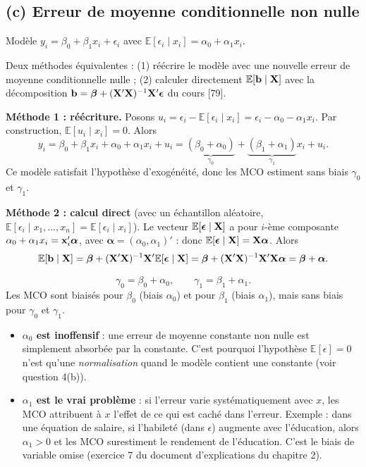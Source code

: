 \documentclass[11pt,a4paper]{article}
\newcommand{\vbeta}{\bm{\beta}}\newcommand{\veps}{\bm{\epsilon}}\newcommand{\valpha}{\bm{\alpha}}
\newcommand{\E}{\mathbb{E}}\newcommand{\Var}{\operatorname{Var}}\newcommand{\Cov}{\operatorname{Cov}}
\begin{document}
\subsection{(c) Erreur de moyenne conditionnelle non nulle}

Modèle $y_i=\beta_0+\beta_1x_i+\epsilon_i$ avec $\E[\epsilon_i\mid x_i]=\alpha_0+\alpha_1x_i$.

\begin{idee}
Deux méthodes équivalentes : (1) réécrire le modèle avec une nouvelle erreur de moyenne conditionnelle nulle ; (2) calculer directement $\E[\vb\mid\vX]$ avec la décomposition $\vb=\vbeta+(\vX'\vX)^{-1}\vX'\veps$ du cours [79].
\end{idee}

\textbf{Méthode 1 : réécriture.} Posons $u_i=\epsilon_i-\E[\epsilon_i\mid x_i]=\epsilon_i-\alpha_0-\alpha_1x_i$. Par construction, $\E[u_i\mid x_i]=0$. Alors
\[
y_i=\beta_0+\beta_1x_i+\alpha_0+\alpha_1x_i+u_i=\underbrace{(\beta_0+\alpha_0)}_{\gamma_0}+\underbrace{(\beta_1+\alpha_1)}_{\gamma_1}x_i+u_i .
\]
Ce modèle satisfait l'hypothèse d'exogénéité, donc les MCO estiment sans biais $\gamma_0$ et $\gamma_1$.

\textbf{Méthode 2 : calcul direct} (avec un échantillon aléatoire, $\E[\epsilon_i\mid x_1,\dots,x_n]=\E[\epsilon_i\mid x_i]$). Le vecteur $\E[\veps\mid\vX]$ a pour $i$-ème composante $\alpha_0+\alpha_1x_i=\vx_i'\valpha$, avec $\valpha=(\alpha_0,\alpha_1)'$ : donc $\E[\veps\mid\vX]=\vX\valpha$. Alors
\[
\E[\vb\mid\vX]=\vbeta+(\vX'\vX)^{-1}\vX'\E[\veps\mid\vX]=\vbeta+(\vX'\vX)^{-1}\vX'\vX\valpha=\vbeta+\valpha .
\]

\begin{reponse}
\[
\gamma_0=\beta_0+\alpha_0,\qquad \gamma_1=\beta_1+\alpha_1 .
\]
Les MCO sont biaisés pour $\beta_0$ (biais $\alpha_0$) et pour $\beta_1$ (biais $\alpha_1$), mais sans biais pour $\gamma_0$ et $\gamma_1$.
\end{reponse}

\begin{intuition}
\begin{itemize}[nosep]
\item \textbf{$\alpha_0$ est inoffensif} : une erreur de moyenne constante non nulle est simplement absorbée par la constante. C'est pourquoi l'hypothèse $\E[\epsilon]=0$ n'est qu'une \emph{normalisation} quand le modèle contient une constante (voir question 4(b)).
\item \textbf{$\alpha_1$ est le vrai problème} : si l'erreur varie systématiquement avec $x$, les MCO attribuent à $x$ l'effet de ce qui est caché dans l'erreur. Exemple : dans une équation de salaire, si l'habileté (dans $\epsilon$) augmente avec l'éducation, alors $\alpha_1>0$ et les MCO surestiment le rendement de l'éducation. C'est le biais de variable omise (exercice 7 du document d'explications du chapitre 2).
\end{itemize}
\end{intuition}
\end{document}
